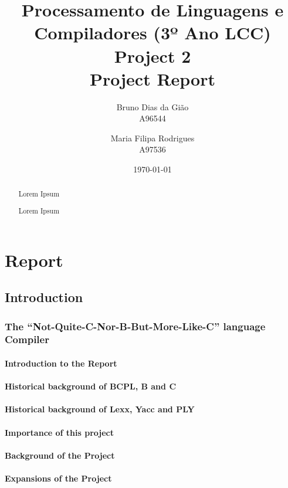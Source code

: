 \documentclass[11pt,a4paper]{report}
\title{Processamento de Linguagens e Compiladores (3º Ano LCC)\\ 
      \textbf{Project 2} \\ Project Report
      }
\date{\today}
\author{Bruno Dias da Gião\\ A96544 \and Maria Filipa Rodrigues \\ A97536}
\begin{document}
\maketitle

\begin{abstract}
Lorem Ipsum
\end{abstract}
\begin{abstract}
Lorem Ipsum
\end{abstract}

\tableofcontents

\chapter{Report} \label{chap:report}
\section{Introduction} \label{intro} 
\subsection{The ``Not-Quite-C-Nor-B-But-More-Like-C'' language Compiler}
\subsubsection{Introduction to the Report}  

\subsubsection{Historical background of BCPL, B and C}

\subsubsection{Historical background of Lexx, Yacc and PLY}
\subsubsection{Importance of this project}


\subsubsection{Background of the Project}
\subsubsection{Expansions of the Project}
\end{document}

